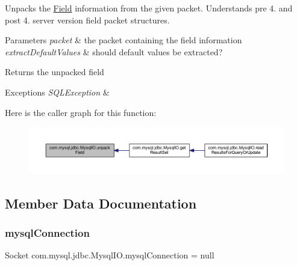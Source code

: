 Unpacks the \mbox{\hyperlink{classcom_1_1mysql_1_1jdbc_1_1_field}{Field}} information from the given packet. Understands pre 4. and post 4. server version field packet structures.


\begin{DoxyParams}{Parameters}
{\em packet} & the packet containing the field information \\
\hline
{\em extract\+Default\+Values} & should default values be extracted?\\
\hline
\end{DoxyParams}
\begin{DoxyReturn}{Returns}
the unpacked field
\end{DoxyReturn}

\begin{DoxyExceptions}{Exceptions}
{\em S\+Q\+L\+Exception} & \\
\hline
\end{DoxyExceptions}
Here is the caller graph for this function\+:
\nopagebreak
\begin{figure}[H]
\begin{center}
\leavevmode
\includegraphics[width=350pt]{classcom_1_1mysql_1_1jdbc_1_1_mysql_i_o_a2da4fe16e54a2d70893f1b5da3bdb1af_icgraph}
\end{center}
\end{figure}


\subsection{Member Data Documentation}
\mbox{\label{classcom_1_1mysql_1_1jdbc_1_1_mysql_i_o_a4e4146e633ac294fc4e60b7168f346e3}} 
\subsubsection{\texorpdfstring{mysql\+Connection}{mysqlConnection}}
{\footnotesize\ttfamily Socket com.\+mysql.\+jdbc.\+Mysql\+I\+O.\+mysql\+Connection = null}

